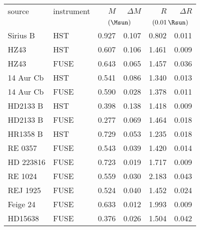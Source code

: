 \begin{tabular}{llrrrr}
source     & instrument & $M$   & $\Delta M$ & $R$ & $\Delta R$ \\
           &     & \multicolumn{2}{c}{$(\Msun)$} & \multicolumn{2}{c}{$(0.01\,\Rsun)$}\\
\hline
Sirius B         & HST  & 0.927 & 0.107 & 0.802 & 0.011\\
HZ43             & HST  & 0.607 & 0.106 & 1.461 & 0.009\\
HZ43             & FUSE & 0.643 & 0.065 & 1.457 & 0.036\\
14 Aur Cb        & HST  & 0.541 & 0.086 & 1.340 & 0.013\\
14 Aur Cb        & FUSE & 0.590 & 0.028 & 1.378 & 0.011\\
HD2133 B         & HST  & 0.398 & 0.138 & 1.418 & 0.009\\
HD2133 B         & FUSE & 0.277 & 0.069 & 1.464 & 0.018\\
HR1358 B         & HST  & 0.729 & 0.053 & 1.235 & 0.018\\
RE 0357          & FUSE & 0.543 & 0.039 & 1.420 & 0.014\\
HD 223816        & FUSE & 0.723 & 0.019 & 1.717 & 0.009\\
RE 1024          & FUSE & 0.559 & 0.030 & 2.183 & 0.043\\
REJ 1925         & FUSE & 0.524 & 0.040 & 1.452 & 0.024\\
Feige 24         & FUSE & 0.633 & 0.012 & 1.993 & 0.009\\
HD15638          & FUSE & 0.376 & 0.026 & 1.504 & 0.042\\
\end{tabular}
